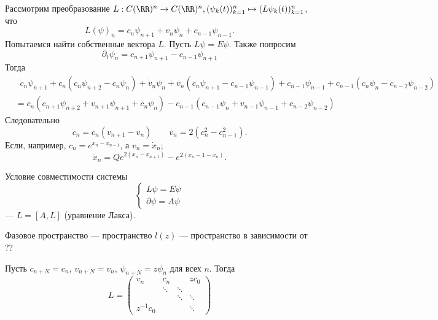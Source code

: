 \documentclass[12pt,a4paper]{article}
\begin{document}
    \begin{example}
        Рассмотрим преобразование $L: C(\RR)^n \to C(\RR)^n, (\psi_k(t))_{k=1}^n \mapsto (L \psi_k(t))_{k=1}^n$, что
        \[L(\psi)_n = c_n \psi_{n+1} + v_n \psi_n + c_{n-1} \psi_{n-1}.\]
        Попытаемся найти собственные вектора $L$. Пусть $L\psi = E \psi$. Также попросим
        \[\partial_t \psi_n = c_{n+1} \psi_{n+1} - c_{n-1} \psi_{n+1}\]
        Тогда
        \begin{align*}
            &\mathop{\phantom{=}} \dot{c}_n \psi_{n+1} + c_n (c_n \psi_{n+2} - c_n \psi_n) + \dot{v}_n \psi_n + v_n (c_n \psi_{n+1} - c_{n-1} \psi_{n-1}) + \dot{c}_{n-1} \psi_{n-1} + c_{n-1} (c_n \psi_n - c_{n-2} \psi_{n-2})\\
            &= c_n(c_{n+1} \psi_{n+2} + v_{n+1} \psi_{n+1} + c_n \psi_n) - c_{n-1} (c_{n-1} \psi_n + v_{n-1} \psi_{n-1} + c_{n-2} \psi_{n-2})
        \end{align*}
        Следовательно
        \[
            \dot{c}_n = c_n (v_{n+1} - v_n)
            \qquad
            \dot{v_n} = 2 (c_n^2 - c_{n-1}^2).
        \]
        Если, например, $c_n = e^{x_n - x_{n-1}}$, а $v_n = \dot{x}_n$;
        \[\ddot{x}_n = Q e^{2(x_n - x_{n+1})} - e^{2(x_n-1 - x_n)}.\]
    \end{example}

    Условие совместимости системы
    \[
        \begin{cases}
            L \psi = E \psi\\
            \partial \psi = A \psi
        \end{cases}
    \]
    --- $\dot{L} = [A, L]$ (уравнение Лакса).

    Фазовое пространство --- пространство $l(z)$ --- пространство в зависимости от ??

    Пусть $c_{n + N} = c_n$, $v_{n + N} = v_n$, $\psi_{n+N} = z \psi_n$ для всех $n$. Тогда
    \[
        L = 
        \begin{pmatrix}
            v_n& c_n&& z c_0\\
            & \ddots& \ddots\\
            && \ddots& \ddots\\
            z^{-1} c_0 &&& \ddots
        \end{pmatrix}
    \]
\end{document}
